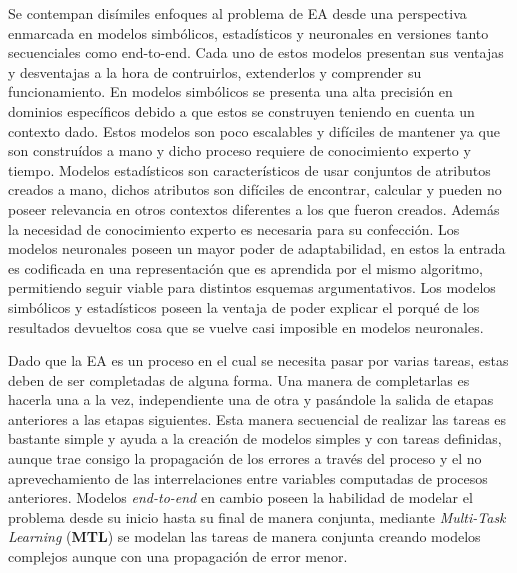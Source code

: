Se contempan disímiles enfoques al problema de EA desde una perspectiva enmarcada en modelos 
simbólicos, estadísticos y neuronales en versiones tanto secuenciales como end-to-end. 
Cada uno de estos modelos presentan sus ventajas y desventajas a la hora de contruirlos, 
extenderlos y comprender su funcionamiento. En modelos simbólicos se presenta una alta
precisión en dominios específicos debido a que estos se construyen teniendo en cuenta un
contexto dado. Estos modelos son poco escalables y difíciles de mantener ya que son construídos
a mano y dicho proceso requiere de conocimiento experto y tiempo. Modelos estadísticos son
característicos de usar conjuntos de atributos creados a mano, dichos atributos son difíciles
de encontrar, calcular y pueden no poseer relevancia en otros contextos diferentes a los que fueron creados. 
Además la necesidad de conocimiento experto es necesaria para su confección. Los modelos neuronales poseen
un mayor poder de adaptabilidad, en estos la entrada es codificada en una representación que es aprendida por
el mismo algoritmo, permitiendo seguir viable para distintos esquemas argumentativos. Los modelos simbólicos y 
estadísticos poseen la ventaja de poder explicar el porqué de los resultados devueltos cosa que se vuelve casi
imposible en modelos neuronales.

Dado que la EA es un proceso en el cual se necesita pasar por varias tareas, estas deben de ser completadas
de alguna forma. Una manera de completarlas es hacerla una a la vez, independiente una de otra y pasándole
la salida de etapas anteriores a las etapas siguientes. Esta manera secuencial de realizar las 
tareas es bastante simple y ayuda a la creación de modelos simples y con tareas definidas, aunque trae consigo 
la propagación de los errores a través del proceso y el no aprevechamiento de las interrelaciones entre variables 
computadas de procesos anteriores. Modelos \emph{end-to-end} en cambio poseen la habilidad de modelar el problema 
desde su inicio hasta su final de manera conjunta, mediante \emph{Multi-Task Learning} (\textbf{MTL}) se modelan
las tareas de manera conjunta creando modelos complejos aunque con una propagación de error menor.


